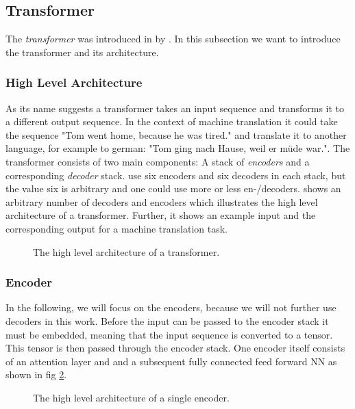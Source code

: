 
\subsection{Transformer}
\label{chp:fundamentals:sec:machine_learning:subsec:transformer}
The \textit{transformer} was introduced in \citeyear{Vaswani:2017} by \textcite{Vaswani:2017}.
In this subsection we want to introduce the transformer and its architecture.

\subsubsection{High Level Architecture}
As its name suggests a transformer takes an input sequence and transforms it to a different output sequence.
In the context of machine translation it could take the sequence "Tom went home, because he was tired." and translate it to another language, for example to german: "Tom ging nach Hause, weil er müde war.".
The transformer consists of two main components: A stack of \textit{encoders} and a corresponding \textit{decoder} stack.
\Textcite{Vaswani:2017} use six encoders and six decoders in each stack, but the value six is arbitrary and one could use more or less en-/decoders.
 shows an arbitrary number of decoders and encoders which illustrates the high level architecture of a transformer.
Further, it shows an example input and the corresponding output for a machine translation task.
\begin{figure}[htpb]
    \centering
    
    \caption[High Level Transformer Architecture]{The high level architecture of a transformer.}\label{fig:fundamentals:machine_learning:transformer}
\end{figure}

\subsubsection{Encoder}
In the following, we will focus on the encoders, because we will not further use decoders in this work.
Before the input can be passed to the encoder stack it must be embedded, meaning that the input sequence is converted to a tensor.
This tensor is then passed through the encoder stack.
One encoder itself consists of an attention layer and and a subsequent fully connected feed forward \ac{NN} as shown in fig \cref{fig:fundamentals:machine_learning:encoder}.
\begin{figure}[htpb]
    \centering
    
    \caption[High Level Encoder Architecture]{The high level architecture of a single encoder.}\label{fig:fundamentals:machine_learning:encoder}
\end{figure}

